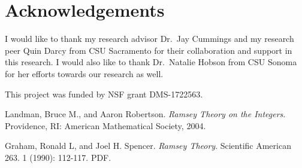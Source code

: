 \documentclass[ fontsize=10pt,twoside]{scrartcl}	%
\begin{document}
\section{Acknowledgements}
I would like to thank my research advisor Dr.\ Jay Cummings and my research peer Quin Darcy from CSU Sacramento for their collaboration and support in this research. I would also like to thank Dr.\ Natalie Hobson from CSU Sonoma for her efforts towards our research as well.

This project was funded by NSF grant DMS-1722563.


\begin{thebibliography}{}
 Landman, Bruce M., and Aaron Robertson. \emph{Ramsey Theory on the Integers}. Providence, RI: American Mathematical Society, 2004.

 Graham, Ronald L, and Joel H. Spencer. \emph{Ramsey Theory}. Scientific American 263. 1 (1990): 112-117. PDF.

\end{thebibliography}




\end{document}
